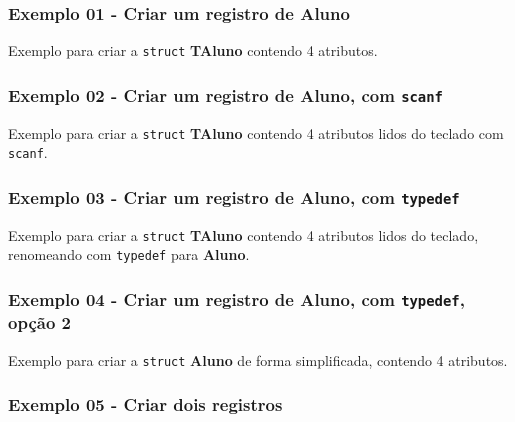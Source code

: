 \documentclass[12pt,a4paper]{article}
\begin{document}
    \hypertarget{exemplo-01---criar-um-registro-de-aluno}{%
\subsubsection{Exemplo 01 - Criar um registro de
Aluno}\label{exemplo-01---criar-um-registro-de-aluno}}

Exemplo para criar a \texttt{struct} \textbf{TAluno} contendo 4
atributos.

    \hypertarget{exemplo-02---criar-um-registro-de-aluno-com-scanf}{%
\subsubsection{\texorpdfstring{Exemplo 02 - Criar um registro de Aluno,
com
\texttt{scanf}}{Exemplo 02 - Criar um registro de Aluno, com scanf}}\label{exemplo-02---criar-um-registro-de-aluno-com-scanf}}

Exemplo para criar a \texttt{struct} \textbf{TAluno} contendo 4
atributos lidos do teclado com \texttt{scanf}.

    \hypertarget{exemplo-03---criar-um-registro-de-aluno-com-typedef}{%
\subsubsection{\texorpdfstring{Exemplo 03 - Criar um registro de Aluno,
com
\texttt{typedef}}{Exemplo 03 - Criar um registro de Aluno, com typedef}}\label{exemplo-03---criar-um-registro-de-aluno-com-typedef}}

Exemplo para criar a \texttt{struct} \textbf{TAluno} contendo 4
atributos lidos do teclado, renomeando com \texttt{typedef} para
\textbf{Aluno}.

    \hypertarget{exemplo-04---criar-um-registro-de-aluno-com-typedef-opuxe7uxe3o-2}{%
\subsubsection{\texorpdfstring{Exemplo 04 - Criar um registro de Aluno,
com \texttt{typedef}, opção
2}{Exemplo 04 - Criar um registro de Aluno, com typedef, opção 2}}\label{exemplo-04---criar-um-registro-de-aluno-com-typedef-opuxe7uxe3o-2}}

Exemplo para criar a \texttt{struct} \textbf{Aluno} de forma
simplificada, contendo 4 atributos.

    \hypertarget{exemplo-05---criar-dois-registros}{%
\subsubsection{Exemplo 05 - Criar dois
registros}\label{exemplo-05---criar-dois-registros}}
\end{document}
